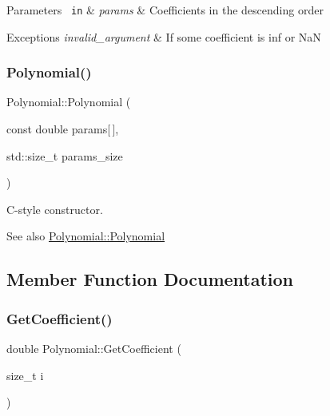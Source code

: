 \begin{DoxyParams}[1]{Parameters}
\mbox{\texttt{ in}}  & {\em params} & Coefficients in the descending order \\
\hline
\end{DoxyParams}

\begin{DoxyExceptions}{Exceptions}
{\em invalid\+\_\+argument} & If some coefficient is inf or NaN \\
\hline
\end{DoxyExceptions}
\mbox{\label{class_polynomial_a0e0ad9a369edaaae98750da039cbde35}} 
\subsubsection{\texorpdfstring{Polynomial()}{Polynomial()}\hspace{0.1cm}{\footnotesize\ttfamily [2/2]}}
{\footnotesize\ttfamily Polynomial\+::\+Polynomial (\begin{DoxyParamCaption}\item[{const double}]{params\mbox{[}$\,$\mbox{]},  }\item[{std\+::size\+\_\+t}]{params\+\_\+size }\end{DoxyParamCaption})\hspace{0.3cm}{\ttfamily [explicit]}}

C-\/style constructor. \begin{DoxySeeAlso}{See also}
\mbox{\hyperlink{class_polynomial_a4884391c3366097d44556691daa3f942}{Polynomial\+::\+Polynomial}} 
\end{DoxySeeAlso}


\subsection{Member Function Documentation}
\mbox{\label{class_polynomial_a18791d35ed881e3f71e40d74f0d62a46}} 
\subsubsection{\texorpdfstring{Get\+Coefficient()}{GetCoefficient()}}
{\footnotesize\ttfamily double Polynomial\+::\+Get\+Coefficient (\begin{DoxyParamCaption}\item[{size\+\_\+t}]{i }\end{DoxyParamCaption})}


